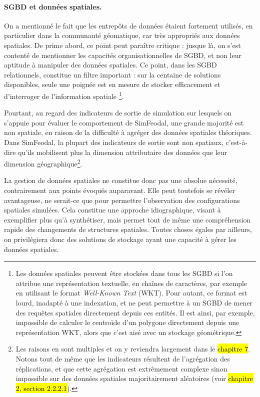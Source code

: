 \paragraph{SGBD et données spatiales.}\label{par:sgbd-spatial}

On a mentionné le fait que les entrepôts de données étaient fortement utilisés, en particulier dans la communauté géomatique, car très appropriés aux données spatiales.
De prime abord, ce point peut paraître critique : jusque là, on s'est contenté de mentionner les capacités organisationnelles de SGBD, et non leur aptitude à manipuler des données spatiales.
Ce point, dans les SGBD relationnels, constitue un filtre important : sur la centaine de solutions disponibles, seule une poignée est en mesure de stocker efficacement et d'interroger de l'information spatiale \footnote{
	Les données spatiales peuvent être stockées dans tous les SGBD si l'on attribue une représentation textuelle, en chaînes de caractères, par exemple en utilisant le format \textit{Well-Known Text} (WKT).
	Pour autant, ce format est lourd, inadapté à une indexation, et ne peut permettre à un SGBD de mener des requêtes spatiales directement depuis ces entités.
	Il est ainsi, par exemple, impossible de calculer le centroïde d'un polygone directement depuis une représentation WKT, alors que c'est aisé avec un stockage géométrique.
}.

Pourtant, au regard des indicateurs de sortie de simulation sur lesquels on s'appuie pour évaluer le comportement de SimFeodal, une grande majorité est non spatiale, en raison de la difficulté à agréger des données spatiales théoriques.
Dans SimFeodal, la plupart des indicateurs de sortie sont non spatiaux, c'est-à-dire qu'ils mobilisent plus la dimension attributaire des données que leur dimension géographique\footnote{
	Les raisons en sont multiples et on y reviendra largement dans le \hl{chapitre 7}.
	Notons tout de même que les indicateurs résultent de l'agrégation des réplications, et que cette agrégation est extrêmement complexe sinon impossible sur des données spatiales majoritairement aléatoires (voir \hl{chapitre 2, section 2.2.2.1}).
}.

La gestion de données spatiales ne constitue donc pas une absolue nécessité, contrairement aux points évoqués auparavant.
Elle peut toutefois se révéler avantageuse, ne serait-ce que pour permettre l'observation des configurations spatiales simulées.
Cela constitue une approche idiographique, visant à exemplifier plus qu'à synthétiser, mais permet tout de même une compréhension rapide des changements de structures spatiales.
Toutes choses égales par ailleurs, on privilégiera donc des solutions de stockage ayant une capacité à gérer les données spatiales.

